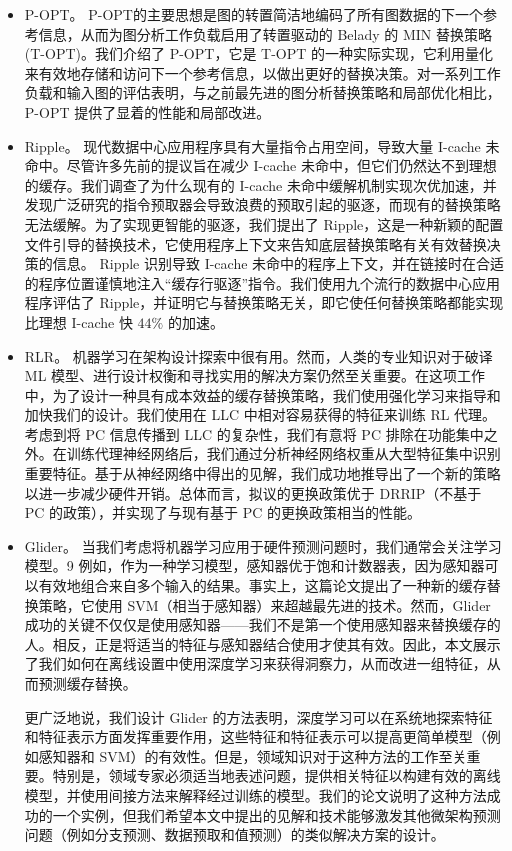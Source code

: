 \documentclass[10pt,journal,compsoc]{IEEEtran}
\begin{document}
\begin{itemize}
\item P-OPT。
P-OPT的主要思想是图的转置简洁地编码了所有图数据的下一个参考信息，从而为图分析工作负载启用了转置驱动的 Belady 的 MIN 替换策略 (T-OPT)。我们介绍了 P-OPT，它是 T-OPT 的一种实际实现，它利用量化来有效地存储和访问下一个参考信息，以做出更好的替换决策。对一系列工作负载和输入图的评估表明，与之前最先进的图分析替换策略和局部优化相比，P-OPT 提供了显着的性能和局部改进。
\item Ripple。
现代数据中心应用程序具有大量指令占用空间，导致大量 I-cache 未命中。尽管许多先前的提议旨在减少 I-cache 未命中，但它们仍然达不到理想的缓存。我们调查了为什么现有的 I-cache 未命中缓解机制实现次优加速，并发现广泛研究的指令预取器会导致浪费的预取引起的驱逐，而现有的替换策略无法缓解。为了实现更智能的驱逐，我们提出了 Ripple，这是一种新颖的配置文件引导的替换技术，它使用程序上下文来告知底层替换策略有关有效替换决策的信息。 Ripple 识别导致 I-cache 未命中的程序上下文，并在链接时在合适的程序位置谨慎地注入“缓存行驱逐”指令。我们使用九个流行的数据中心应用程序评估了 Ripple，并证明它与替换策略无关，即它使任何替换策略都能实现比理想 I-cache 快 $44\%$ 的加速。
\item RLR。
机器学习在架构设计探索中很有用。然而，人类的专业知识对于破译 ML 模型、进行设计权衡和寻找实用的解决方案仍然至关重要。在这项工作中，为了设计一种具有成本效益的缓存替换策略，我们使用强化学习来指导和加快我们的设计。我们使用在 LLC 中相对容易获得的特征来训练 RL 代理。考虑到将 PC 信息传播到 LLC 的复杂性，我们有意将 PC 排除在功能集中之外。在训练代理神经网络后，我们通过分析神经网络权重从大型特征集中识别重要特征。基于从神经网络中得出的见解，我们成功地推导出了一个新的策略以进一步减少硬件开销。总体而言，拟议的更换政策优于 DRRIP（不基于 PC 的政策），并实现了与现有基于 PC 的更换政策相当的性能。



\item Glider。
当我们考虑将机器学习应用于硬件预测问题时，我们通常会关注学习模型。9 例如，作为一种学习模型，感知器优于饱和计数器表，因为感知器可以有效地组合来自多个输入的结果。事实上，这篇论文提出了一种新的缓存替换策略，它使用 SVM（相当于感知器）来超越最先进的技术。然而，Glider 成功的关键不仅仅是使用感知器——我们不是第一个使用感知器来替换缓存的人。相反，正是将适当的特征与感知器结合使用才使其有效。因此，本文展示了我们如何在离线设置中使用深度学习来获得洞察力，从而改进一组特征，从而预测缓存替换。

更广泛地说，我们设计 Glider 的方法表明，深度学习可以在系统地探索特征和特征表示方面发挥重要作用，这些特征和特征表示可以提高更简单模型（例如感知器和 SVM）的有效性。但是，领域知识对于这种方法的工作至关重要。特别是，领域专家必须适当地表述问题，提供相关特征以构建有效的离线模型，并使用间接方法来解释经过训练的模型。我们的论文说明了这种方法成功的一个实例，但我们希望本文中提出的见解和技术能够激发其他微架构预测问题（例如分支预测、数据预取和值预测）的类似解决方案的设计。
\end{itemize}
\end{document}
